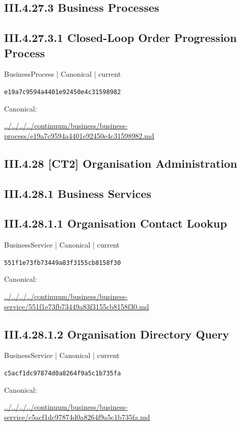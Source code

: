 \documentclass[10pt,a4paper]{article}
\begin{document}
\subsection*{III.4.27.3 Business Processes}
\subsection*{III.4.27.3.1 Closed-Loop Order Progression Process}
{\small BusinessProcess | Canonical | current}\par
\texttt{e19a7c9594a4401e92450e4c31598982}\par
Canonical: \par
{\footnotesize\url{../../../../continuum/business/business-process/e19a7c9594a4401e92450e4c31598982.md}}\par
\subsection*{III.4.28 [CT2] Organisation Administration}
\subsection*{III.4.28.1 Business Services}
\subsection*{III.4.28.1.1 Organisation Contact Lookup}
{\small BusinessService | Canonical | current}\par
\texttt{551f1e73fb73449a83f3155cb8158f30}\par
Canonical: \par
{\footnotesize\url{../../../../continuum/business/business-service/551f1e73fb73449a83f3155cb8158f30.md}}\par
\subsection*{III.4.28.1.2 Organisation Directory Query}
{\small BusinessService | Canonical | current}\par
\texttt{c5acf1dc97874d0a8264f9a5c1b735fa}\par
Canonical: \par
{\footnotesize\url{../../../../continuum/business/business-service/c5acf1dc97874d0a8264f9a5c1b735fa.md}}\par
\end{document}
